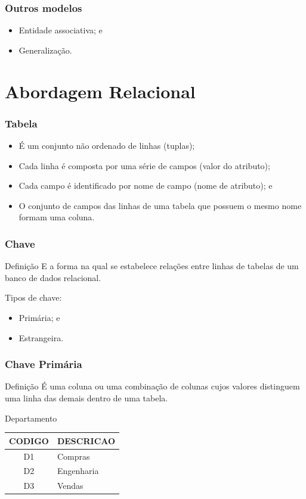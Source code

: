 \documentclass{beamer}
\begin{document}
\begin{frame}
\frametitle{Outros modelos}

\begin{itemize}
	\item Entidade associativa; e
	\item Generalização.
\end{itemize}
\end{frame}

\section{Abordagem Relacional}

\begin{frame}
\frametitle{Tabela}

\begin{itemize}
	\item É um conjunto não ordenado de linhas (tuplas);
	\item Cada linha é composta por uma série de campos (valor do atributo);
	\item Cada campo é identificado por nome de campo (nome de atributo); e
	\item O conjunto de campos das linhas de uma tabela que possuem o
	mesmo nome formam uma coluna.
\end{itemize}
\end{frame}

\begin{frame}
\frametitle{Chave}

\begin{block}{Definição}
	E a forma na qual se estabelece relações entre linhas de tabelas de um
	banco de dados relacional.
\end{block}\vfill

Tipos de chave:
\begin{itemize}
	\item Primária; e 
	\item Estrangeira.
\end{itemize}
\end{frame}

\begin{frame}
\frametitle{Chave Primária}

\begin{block}{Definição}
	É uma coluna ou uma combinação de colunas cujos valores distinguem uma linha das demais dentro de uma tabela.
\end{block}\vfill

\begin{exampleblock}{Departamento}
\centering
\begin{tabular}{|c|l|}
		\hline
		CODIGO & DESCRICAO \\ \hline
		D1 & Compras \\ \hline
		D2 & Engenharia \\ \hline
		D3 & Vendas \\ \hline
\end{tabular}
\end{exampleblock}		
\end{frame}
\end{document}
